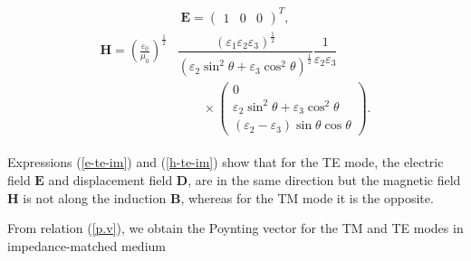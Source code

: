 \documentclass[9pt,twocolumn,twoside]{osajnl}
\begin{document}
\begin{equation}\label{e-te-im}
\mathbf{E}=
 \begin{pmatrix}
 1&0&0
 \end{pmatrix}^{T},
\end{equation}
\begin{align}\label{h-te-im}
\begin{split}
  \mathbf{H}= \left(\frac{\varepsilon_{0}}{\mu_{0}}\right)^{\frac{1}{2}}&\dfrac{(\varepsilon_{1}\varepsilon_{2}\varepsilon_{3})^{\frac{1}{2}}}{({\varepsilon_{2}\sin^{2}{\theta}+\varepsilon_{3}\cos^{2}{\theta}})^{\frac{1}{2}}}\dfrac{1}{\varepsilon_{2}\varepsilon_{3}}
  \\ & \qquad\times
  \begin{pmatrix}
  0\\
 \varepsilon_{2} \sin^{2}\theta + \varepsilon_{3}\cos^{2}\theta\\
 (\varepsilon_{2}-\varepsilon_{3})\sin\theta\cos\theta
 \end{pmatrix}.
\end{split}
\end{align}

Expressions (\ref{e-te-im}) and (\ref{h-te-im}) show that  for the TE mode, the electric field $\mathbf{E}$ and displacement field $\mathbf{D}$, are in the same direction but the magnetic field $\mathbf{H}$ is not along the induction $\mathbf{B}$, whereas for the  TM mode it is the opposite.


From relation (\ref{p.v}), we obtain the Poynting vector for the TM and TE modes in impedance-matched medium
\end{document}
